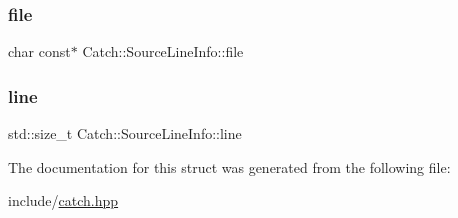 \subsubsection{\texorpdfstring{file}{file}}
{\footnotesize\ttfamily char const$\ast$ Catch\+::\+Source\+Line\+Info\+::file}

\mbox{\label{structCatch_1_1SourceLineInfo_a841e5d696c7b9cde24e45e61dd979c77}} 
\subsubsection{\texorpdfstring{line}{line}}
{\footnotesize\ttfamily std\+::size\+\_\+t Catch\+::\+Source\+Line\+Info\+::line}



The documentation for this struct was generated from the following file\+:\begin{DoxyCompactItemize}
\item 
include/\mbox{\hyperlink{catch_8hpp}{catch.\+hpp}}\end{DoxyCompactItemize}
